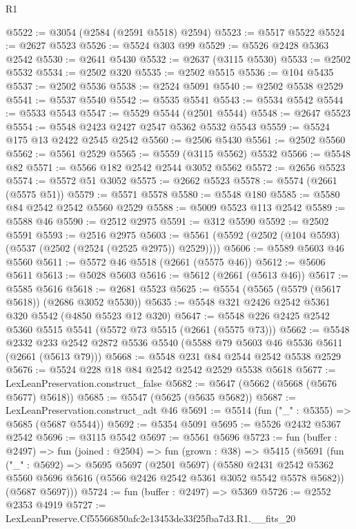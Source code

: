 \begin{lexlean}{R1}
\begin{coremodule}
@5522 := @3054 (@2584 (@2591 @5518) @2594)
@5523 := @5517 @5522
@5524 := @2627 @5523
@5526 := @5524 @303 @99
@5529 := @5526 @2428 @5363 @2542
@5530 := @2641 @5430
@5532 := @2637 (@3115 @5530)
@5533 := @2502 @5532
@5534 := @2502 @320
@5535 := @2502 @5515
@5536 := @104 @5435
@5537 := @2502 @5536
@5538 := @2524 @5091
@5540 := @2502 @5538 @2529
@5541 := @5537 @5540
@5542 := @5535 @5541
@5543 := @5534 @5542
@5544 := @5533 @5543
@5547 := @5529 @5544 (@2501 @5544)
@5548 := @2647 @5523
@5554 := @5548 @2423 @2427 @2547 @5362 @5532 @5543
@5559 := @5524 @175 @13 @2422 @2545 @2542
@5560 := @2506 @5430
@5561 := @2502 @5560
@5562 := @5561 @2529
@5565 := @5559 (@3115 @5562) @5532
@5566 := @5548 @82
@5571 := @5566 @182 @2542 @2544 @3052 @5562
@5572 := @2656 @5523
@5574 := @5572 @51 @3052
@5575 := @2662 @5523
@5578 := @5574 (@2661 (@5575 @51))
@5579 := @5571 @5578
@5580 := @5548 @180
@5585 := @5580 @84 @2542 @2542 @5560 @2529
@5588 := @5009 @5523 @113 @2542
@5589 := @5588 @46
@5590 := @2512 @2975
@5591 := @312 @5590
@5592 := @2502 @5591
@5593 := @2516 @2975
@5603 := @5561 (@5592 (@2502 (@104 @5593) (@5537 (@2502 (@2524 (@2525 @2975)) @2529))))
@5606 := @5589 @5603 @46 @5560
@5611 := @5572 @46 @5518 (@2661 (@5575 @46))
@5612 := @5606 @5611
@5613 := @5028 @5603
@5616 := @5612 (@2661 (@5613 @46))
@5617 := @5585 @5616
@5618 := @2681 @5523
@5625 := @5554 (@5565 (@5579 (@5617 @5618)) (@2686 @3052 @5530))
@5635 := @5548 @321 @2426 @2542 @5361 @320 @5542 (@4850 @5523 @12 @320)
@5647 := @5548 @226 @2425 @2542 @5360 @5515 @5541 (@5572 @73 @5515 (@2661 (@5575 @73)))
@5662 := @5548
    @2332
    @233
    @2542
    @2872
    @5536
    @5540
    (@5588 @79 @5603 @46 @5536 @5611 (@2661 (@5613 @79)))
@5668 := @5548 @231 @84 @2544 @2542 @5538 @2529
@5676 := @5524 @228 @18 @84 @2542 @2542 @2529 @5538 @5618
@5677 := LexLeanPreservation.construct_false
@5682 := @5647 (@5662 (@5668 (@5676 @5677) @5618))
@5685 := @5547 (@5625 (@5635 @5682))
@5687 := LexLeanPreservation.construct_adt @46
@5691 := @5514 (fun ("_" : @5355) => @5685 (@5687 @5544))
@5692 := @5354 @5091
@5695 := @5526 @2432 @5367 @2542
@5696 := @3115 @5542
@5697 := @5561 @5696
@5723 := fun (buffer : @2497) =>
  fun (joined : @2504) =>
  fun (grown : @38) =>
  @5415
    (@5691
      (fun ("_" : @5692) =>
      @5695
        @5697
        (@2501 @5697)
        (@5580
          @2431
          @2542
          @5362
          @5560
          @5696
          @5616
          (@5566 @2426 @2542 @5361 @3052 @5542 @5578 @5682))
        (@5687 @5697)))
@5724 := fun (buffer : @2497) => @5369
@5726 := @2552 @2353 @4919
@5727 := LexLeanPreserve.Cf55566850afc2e13453de33f25fba7d3.R1.__fits_20

\end{coremodule}
\end{lexlean}
